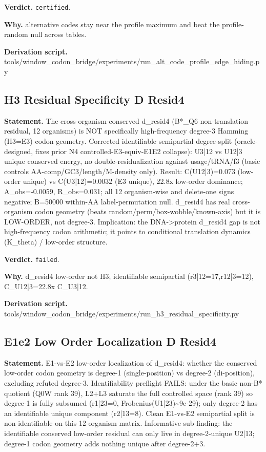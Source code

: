 \textbf{Verdict.} \texttt{certified}.

\textbf{Why.} alternative codes stay near the profile maximum and beat the profile-random null across tables.

\textbf{Derivation script.} tools/window\_codon\_bridge/experiments/run\_alt\_code\_profile\_edge\_hiding.py

\subsection{H3 Residual Specificity D Resid4}\label{sec:bridge-h3-residual-specificity-d-resid4}
\textbf{Statement.} The cross-organism-conserved d\_resid4 (B*\_Q6 non-translation residual, 12 organisms) is NOT
specifically high-frequency degree-3 Hamming (H3=E3) codon geometry. Corrected identifiable
semipartial degree-split (oracle-designed, fixes prior N4 controlled-E3-equiv-E1E2 collapse): U3|12
vs U12|3 unique conserved energy, no double-residualization against usage/tRNA/f3 (basic controls
AA-comp/GC3/length/M-density only). Result: C(U12|3)=0.073 (low-order unique) vs C(U3|12)=0.0032 (E3
unique), 22.8x low-order dominance; A\_obs=-0.0059, R\_obs=0.031; all 12 organism-wise and
delete-one signs negative; B=50000 within-AA label-permutation null. d\_resid4 has real
cross-organism codon geometry (beats random/perm/box-wobble/known-axis) but it is LOW-ORDER, not
degree-3. Implication: the DNA->protein d\_resid4 gap is not high-frequency codon arithmetic; it
points to conditional translation dynamics (K\_theta) / low-order structure.

\textbf{Verdict.} \texttt{failed}.

\textbf{Why.} d\_resid4 low-order not H3; identifiable semipartial (r3|12=17,r12|3=12), C\_U12|3=22.8x C\_U3|12.

\textbf{Derivation script.} tools/window\_codon\_bridge/experiments/run\_h3\_residual\_specificity.py

\subsection{E1e2 Low Order Localization D Resid4}\label{sec:bridge-e1e2-low-order-localization-d-resid4}
\textbf{Statement.} E1-vs-E2 low-order localization of d\_resid4: whether the conserved low-order codon geometry is
degree-1 (single-position) vs degree-2 (di-position), excluding refuted degree-3. Identifiability
preflight FAILS: under the basic non-B* quotient (Q0W rank 39), L2+L3 saturate the full controlled
space (rank 39) so degree-1 is fully subsumed (r1|23=0, Frobenius(U1|23)\textasciitilde{}9e-29);
only degree-2 has an identifiable unique component (r2|13=8). Clean E1-vs-E2 semipartial split is
non-identifiable on this 12-organism matrix. Informative sub-finding: the identifiable conserved
low-order residual can only live in degree-2-unique U2|13; degree-1 codon geometry adds nothing
unique after degree-2+3.

